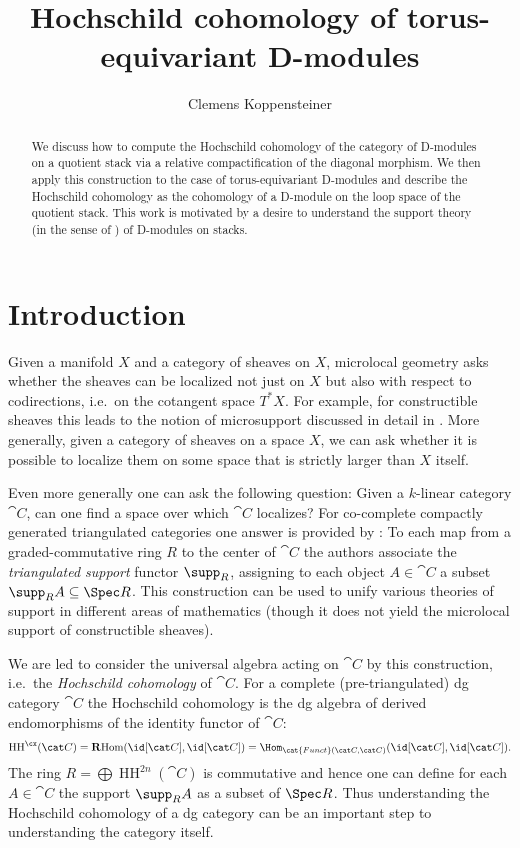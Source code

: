 \documentclass[english]{ck-article}
\title{Hochschild cohomology of torus-equivariant D-modules}
\author{Clemens Koppensteiner}
\newcommand{\HCoh}{\operatorname{HH}^\cx}
\newcommand\ΓdR{Γ_{\mkern-4mu\dR}}
\newcommand\Γsub[1]{\Gamma_{\mkern-3mu#1}}
\begin{document}
\maketitle

\begin{abstract}
    We discuss how to compute the Hochschild cohomology of the category of D-modules on a quotient stack via a relative compactification of the diagonal morphism.
    We then apply this construction to the case of torus-equivariant D-modules and describe the Hochschild cohomology as the cohomology of a D-module on the loop space of the quotient stack.
    This work is motivated by a desire to understand the support theory (in the sense of \cite{BensonIyengarKrause:2008:LocalCohomologyAndSupportForTriangulatedCategories}) of D-modules on stacks.
\end{abstract}

\section{Introduction}

Given a manifold $X$ and a category of sheaves on $X$, microlocal geometry asks whether the sheaves can be localized not just on $X$ but also with respect to codirections, i.e.~on the cotangent space $T^*X$.
For example, for constructible sheaves this leads to the notion of microsupport discussed in detail in \cite{KashiwaraSchapira:1994:SheavesOnManifolds}.
More generally, given a category of sheaves on a space $X$, we can ask whether it is possible to localize them on some space that is strictly larger than $X$ itself.

Even more generally one can ask the following question: Given a $k$-linear category $\cat C$, can one find a space over which $\cat C$ localizes?
For co-complete compactly generated triangulated categories one answer is provided by \cite{BensonIyengarKrause:2008:LocalCohomologyAndSupportForTriangulatedCategories}:
To each map from a graded-commutative ring $R$ to the center of $\cat C$ the authors associate the \emph{triangulated support} functor $\supp_R$, assigning to each object $A ∈ \cat C$ a subset $\supp_R A \subseteq \Spec R$.
This construction can be used to unify various theories of support in different areas of mathematics (though it does not yield the microlocal support of constructible sheaves).

We are led to consider the universal algebra acting on $\cat C$ by this construction, i.e.~the \emph{Hochschild cohomology} of $\cat C$.
For a complete (pre-triangulated) dg category $\cat C$ the Hochschild cohomology is the dg algebra of derived endomorphisms of the identity functor of $\cat C$:
\[
    \HCoh(\cat C)
    = \operatorname{\mathbf{R}Hom}(\id[\cat C], \id[\cat C])
    = \Hom_{\cat{Funct}(\cat C, \cat C)}(\id[\cat C], \id[\cat C]).
\]
The ring $R = \bigoplus \operatorname{HH}^{2n}(\cat C)$ is commutative and hence one can define for each $A ∈ \cat C$ the support $\supp_R A$ as a subset of $\Spec R$.
Thus understanding the Hochschild cohomology of a dg category can be an important step to understanding the category itself.
\end{document}

